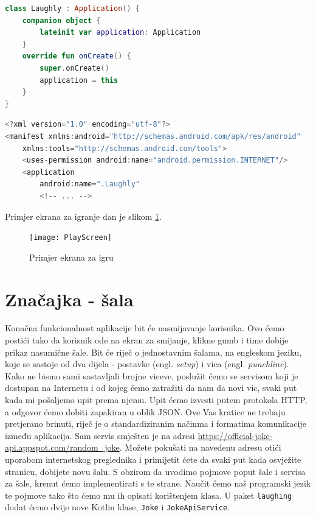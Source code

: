 \documentclass[11pt,a4paper,twoside]{article}
\begin{document}
\begin{lstlisting}[caption={Aplikacijska klasa - Laughly.kt}, label={lst:app-laughly}, language=Kotlin]
class Laughly : Application() {
	companion object {
		lateinit var application: Application
	}
	override fun onCreate() {
		super.onCreate()
		application = this
	}
}	
\end{lstlisting}

\begin{lstlisting}[caption={Manifest datoteka - AndroidManifest.xml}, label={lst:manifest}, language=Kotlin]
<?xml version="1.0" encoding="utf-8"?>
<manifest xmlns:android="http://schemas.android.com/apk/res/android"
	xmlns:tools="http://schemas.android.com/tools">
	<uses-permission android:name="android.permission.INTERNET"/>
	<application
		android:name=".Laughly"
		<!-- ... -->
\end{lstlisting}

Primjer ekrana za igranje dan je slikom \ref{fig:PlayScreen}.

\begin{figure}[!h]
	\centering
	\texttt{[image: PlayScreen]}
	\caption{Primjer ekrana za igru}	
	\label{fig:PlayScreen}
\end{figure}

\section{Značajka - šala}

Konačna funkcionalnost aplikacije bit će nasmijavanje korisnika. Ovo ćemo postići tako da korisnik ode na ekran za smijanje, klikne gumb i time dobije prikaz nasumične šale. Bit će riječ o jednostavnim šalama, na engleskom jeziku, koje se sastoje od dva dijela - postavke (engl. \textit{setup}) i vica (engl. \textit{punchline}). Kako ne bismo sami sastavljali brojne viceve, poslužit ćemo se servisom koji je dostupan na Internetu i od kojeg ćemo zatražiti da nam da novi vic, svaki put kada mi pošaljemo upit prema njemu. Upit ćemo izvesti putem protokola HTTP, a odgovor ćemo dobiti zapakiran u oblik JSON. Ove Vas kratice ne trebaju pretjerano brinuti, riječ je o standardiziranim načinma i formatima komunikacije između aplikacija. Sam servis smješten je na adresi \url{https://official-joke-api.appspot.com/random_joke}. Možete pokušati na navedenu adresu otići uporabom internetskog preglednika i primijetit ćete da svaki put kada osvježite stranicu, dobijete novu šalu. S obzirom da uvodimo pojmove poput šale i servisa za šale, krenut ćemo implementirati s te strane. Naučit ćemo naš programski jezik te pojmove tako što ćemo mu ih opisati korištenjem klasa. U paket \texttt{laughing} dodat ćemo dvije nove Kotlin klase, \texttt{Joke} i \texttt{JokeApiService}.
\end{document}
